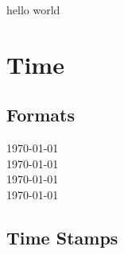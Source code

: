 \documentclass{article}
\begin{document}
hello world
\section{Time}
\subsection{Formats}
\photodate\today{}\\
\reallyshortusdate\today{}\\
\shortusdate\today{}\\
\longusdate\today{}\\
\subsection{Time Stamps}
\reallysmalltimestamp\\
\smalltimestamp\\
\timestamp\\
\terminaltimestamp
\end{document}
